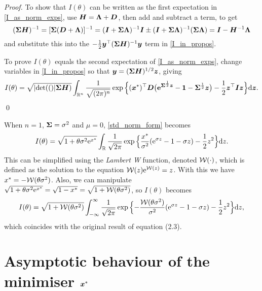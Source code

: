 \begin{proof}
To show that $I(\theta)$ can be written as the first expectation in
\eqref{I_as_norm_exps}, use $\bm{H} = \bm{\Lambda} + \bm{D}$, then add and subtract a term, to get
%
\[ (\bm{\Sigma} \bm{H})^{-1} = [\bm{\Sigma} (\bm{D} + \bm{\Lambda})]^{-1} = (\bm{I} + \bm{\Sigma} \bm{\Lambda})^{-1} \bm{I}  \pm (\bm{I} + \bm{\Sigma} \bm{\Lambda})^{-1} (\bm{\Sigma} \bm{\Lambda})  = \bm{I} - \bm{H}^{-1} \bm{\Lambda}  \]
%
and substitute this into the $-\frac12 \bm{y}^\top (\bm{\Sigma} \bm{H})^{-1} \bm{y}$ term in \eqref{I_in_propos}. 

To prove $I(\theta)$ equals the second expectation of \eqref{I_as_norm_exps},
change variables in \eqref{I_in_propos} so that $\bm{y} = (\bm{\Sigma} \bm{H})^{1/2} \bm{z}$, giving
\begin{equation} \label{std_norm_form}
	I(\theta) = \sqrt{\lvert \mathrm{det}(() \rvert\bm{\Sigma} \bm{H})}
 \int_{\mathbb{R}^n} \frac{1}{\sqrt{(2\pi)^n}}
 \exp\Big\{ (\bm{x}^*)^\top \bm{D} \big( \bm{\mathrm{e}}^{\bm{\Sigma}^{\frac12}\bm{z}}
 - \bm{1} - \bm{\Sigma}^{\frac12}\bm{z} \big) - \frac12 \bm{z}^\top \bm{I} \bm{z} \Big\}\mathrm{d} \bm{z}.
\end{equation}
\qed
\end{proof}

\begin{remark}\label{R:W} When $n=1$, $\bm{\Sigma} = \sigma^2$ and $\mu=0$,
\eqref{std_norm_form} becomes
%
\[
	I(\theta) = \sqrt{ 1 + \theta \sigma^2 \mathrm{e}^{x^*}} \int_{\mathbb{R}}
        \frac{1}{\sqrt{2\pi}} \exp\Big\{ \frac{x^*}{\sigma^2} (
        \mathrm{e}^{\sigma z} - 1 - \sigma z ) - \frac12 z^2 \Big\} \mathrm{d} z.
\]
%
This can be simplified using the \emph{Lambert W} function, denoted $\mathcal{W}(\cdot)$,
which is defined \cite{corless1996lambertw} as the solution to the equation $\mathcal{W}(z)
\mathrm{e}^{\mathcal{W}(z)} = z$. With this we have $x^* =
-\mathcal{W}(\theta \sigma^2)$. Also, we can manipulate
$\sqrt{ 1 + \theta \sigma^2 \mathrm{e}^{x^*}}
 =  \sqrt{ 1 - x^* } = \sqrt{ 1 + \mathcal{W}(\theta \sigma^2)}$,
so $I(\theta)$ becomes
\[
	I(\theta) = \sqrt{ 1 + \mathcal{W}(\theta \sigma^2)}
 \int_{-\infty}^\infty \frac{1}{\sqrt{2\pi}}
 \exp\Big\{ {-}\frac{\mathcal{W}(\theta \sigma^2)}{\sigma^2}
 ( \mathrm{e}^{\sigma z} - 1 - \sigma z ) - \frac12 z^2 \Big\} \mathrm{d} z,
\]
which coincides with the original result of \cite{asmussen2014laplace}
equation (2.3).
\end{remark}

\section{Asymptotic behaviour of the minimiser $\bm{x}^*$} \label{sec:x_star_asymp_}

